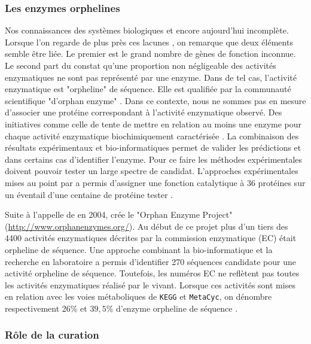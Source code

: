 \begin{refsegment}
    
    \subsubsection{Les enzymes orphelines}
    
    Nos connaissances des systèmes biologiques et encore aujourd'hui incomplète. Lorsque l'on regarde de plus près ces lacunes , on remarque que deux éléments semble être liée. Le premier est le grand nombre de gènes de fonction inconnue. Le second part du constat qu'une proportion non négligeable des activités enzymatiques ne sont pas représenté par une enzyme. Dans de tel cas, l'activité enzymatique est "orpheline" de séquence. Elle est qualifiée par la communauté scientifique "d'orphan enzyme" \cite{lespinet2005orphan}. Dans ce contexte, nous ne sommes pas en mesure d'associer une protéine correspondant à l'activité enzymatique observé. Des initiatives comme celle de \citeauthor{karp2004call} tente de mettre en relation au moins une enzyme pour chaque activité enzymatique biochimiquement caractérisée \cite{karp2004call}. La combinaison des résultats expérimentaux et bio-informatiques permet de valider les prédictions et dans certains cas d'identifier l'enzyme. Pour ce faire les méthodes expérimentales doivent pouvoir tester un large spectre de candidat. L'approches expérimentales mises au point par \citeauthor{kuznetsova2005enzyme} a permis d'assigner une fonction catalytique à 36 protéines sur un éventail d'une centaine de protéine tester \cite{kuznetsova2005enzyme}.
    
    Suite à l'appelle de \citeauthor{karp2004call} en 2004, \citeauthor{shearer2014finding} crée le "Orphan Enzyme Project" (\url{http://www.orphanenzymes.org/}). Au début de ce projet plus d'un tiers des 4400 activités enzymatiques décrites par la commission enzymatique (\gls{EC}) était orpheline de séquence. Une approche combinant la bio-informatique et la recherche en laboratoire a permis d'identifier 270 séquences candidate pour une activité orpheline de séquence\cite{shearer2014finding}. Toutefois, les numéros \gls{EC} ne reflètent pas toutes les activités enzymatiques réalisé par le vivant. Lorsque ces activités sont mises en relation avec les voies métaboliques de \texttt{KEGG} et \texttt{MetaCyc}, on dénombre  respectivement 26\% et $39,5$\% d'enzyme orpheline de séquence \cite{sorokina2014profiling}.
    
    \subsubsection{Rôle de la curation}
    

\end{refsegment}
